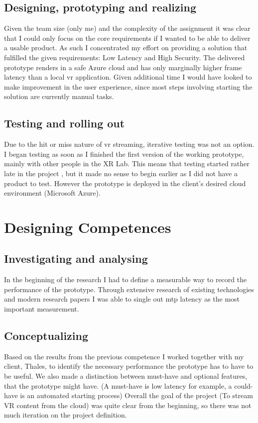 \documentclass[]{article}
\begin{document}
\subsection{Designing, prototyping and realizing}
Given the team size (only me) and the complexity of the assignment it was clear that I could only focus on the core requirements if I wanted to be able to deliver a usable product. As such I concentrated my effort on providing a solution that fulfilled the given requirements: Low Latency and High Security. The delivered prototype renders in a safe Azure cloud and has only marginally higher frame latency than a local \acrshort{vr} application. Given additional time I would have looked to make improvement in the user experience, since most steps involving starting the solution are currently manual tasks.

\subsection{Testing and rolling out}
Due to the hit or miss nature of \acrshort{vr} streaming, iterative testing was not an option. I began testing as soon as I finished the first version of the working prototype, mainly with other people in the XR Lab. This means that testing started rather late in the project , but it made no sense to begin earlier as I did not have a product to test. However the prototype is deployed in the client's desired cloud environment (Microsoft Azure).

\section{Designing Competences}
\subsection{Investigating and analysing}
In the beginning of the research I had to define a measurable way to record the performance of the prototype. Through extensive research of existing technologies and modern research papers I was able to single out \acrfull{mtp} latency as the most important measurement.

\subsection{Conceptualizing}
\label{sec:conc}
Based on the results from the previous competence I worked together with my client, Thales, to identify the necessary performance the prototype has to have to be useful. We also made a distinction between must-have and optional features, that the prototype might have. (A must-have is low latency for example, a could-have is an automated starting process) Overall the goal of the project (To stream VR content from the cloud) was quite clear from the beginning, so there was not much iteration on the project definition.
\end{document}
